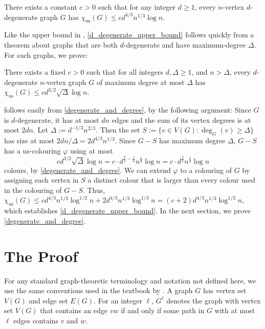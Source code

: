 \documentclass{patmorin}
\newcommand{\trn}{\chi_{\mathrm{us}}}
\begin{document}
\begin{thm}\label{d_degenerate_upper_bound}
  There exists a constant $c>0$ such that for any integer $d\ge 1$, every $n$-vertex $d$-degenerate graph $G$ has $\trn(G) \le c d^{4/3}n^{1/3}\log n$.
\end{thm}

Like the upper bound in \cite{karpas.neiman.ea:on}, \cref{d_degenerate_upper_bound} follows quickly from a theorem about graphs that are both $d$-degenerate and have maximum-degree $\Delta$. For such graphs, we prove:

\begin{thm}\label{degenerate_and_degree}
  There exists a fixed $c>0$ such that
  for all integers $d,\Delta \ge 1$, and $n> \Delta$, every $d$-degenerate $n$-vertex graph $G$ of maximum degree at most $\Delta$ has
  $\trn(G)\leq cd^{3/2}\sqrt{\Delta}\log n$.
\end{thm}

 follows easily from \cref{degenerate_and_degree}, by the following argument:  Since $G$ is $d$-degenerate, it has at most $dn$ edges and the sum of its vertex degrees is at most $2dn$.  Let $\Delta:=d^{-1/3}n^{2/3}$. Then the set $S:=\{v\in V(G):\deg_G(v)\ge \Delta\}$ has size at most $2dn/\Delta=2d^{4/3}n^{1/3}$.  Since $G-S$ has maximum degree $\Delta$, $G-S$ has a us-colouring $\varphi$ using at most
\[
  cd^{3/2}\sqrt{\Delta}\log n
  = c\cdot d^{\tfrac{3}{2}-\tfrac{1}{6}}n^{\tfrac{1}{3}}\log n
  = c\cdot d^{\tfrac{4}{3}}n^{\tfrac{1}{3}}\log n
\]
 colours, by \cref{degenerate_and_degree}. We can extend $\varphi$ to a colouring of $G$ by assigning each vertex in $S$ a distinct colour that is larger than every colour used in the colouring of $G-S$.  Thus, $\trn(G)\le cd^{4/3}n^{1/3}\log^{1/2} n+2d^{4/3}n^{1/3}\log^{1/3} n= (c+2)d^{4/3}n^{1/3}\log^{1/3} n$, which establishes \cref{d_degenerate_upper_bound}.  In the next section, we prove \cref{degenerate_and_degree}.

\section{The Proof}

For any standard graph-theoretic terminology and notation not defined here, we use the same conventions used in the textbook by \citet{diestel:graph}.  A graph $G$ has vertex set $V(G)$ and edge set $E(G)$.  For an integer $\ell$, $G^\ell$ denotes the graph with vertex set $V(G)$ that contains an edge $vw$ if and only if some path in $G$ with at most $\ell$ edges contains $v$ and $w$.
\end{document}
